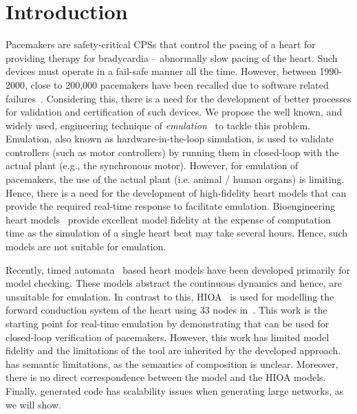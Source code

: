 \section{Introduction}

Pacemakers are safety-critical \acp{CPS} that control the pacing of a
heart for providing therapy for bradycardia -- abnormally slow pacing of
the heart. Such devices must operate in a fail-safe manner all the
time. However, between 1990-2000, close to 200,000 pacemakers have been
recalled due to software related
failures~\cite{alemzadeh13}. Considering this, there is a need for the
development of better processes for validation and certification of such
devices. We propose the well known, and widely used, engineering
technique of \emph{emulation}~\cite{patel2015survey} to tackle this
problem. Emulation, also known as hardware-in-the-loop simulation, is
used to validate controllers (such as motor controllers) by running them
in closed-loop with the actual plant (e.g., the synchronous motor).
However, for emulation of pacemakers, the use of the actual plant
(i.e. animal / human organs) is limiting. Hence, there is a need for the
development of high-fidelity heart models that can provide the required
real-time response to facilitate emulation. Bioengineering heart
models~\cite{Trayanova2014} provide excellent model fidelity at the
expense of computation time as the simulation of a single heart beat may
take several hours. Hence, such models are not suitable for emulation.

Recently, timed automata~\cite{zhihao12} based heart models have been
developed primarily for model checking. These models abstract the
continuous dynamics and hence, are unsuitable for emulation. In contrast
to this, \acf{HIOA}~\cite{alur2015book, raskin05} is used for modelling
the forward conduction system of the heart using 33 nodes
in~\cite{chen14}.
This work is the starting point for real-time
emulation by demonstrating that \simulink can be used for closed-loop
verification of pacemakers. However, this work has limited model
fidelity and the limitations of the tool \simulink are inherited by the
developed approach. \simulink has semantic limitations, as the semantics
of composition is unclear. Moreover, there is no
direct correspondence between the \simulink model and the \ac{HIOA}
models. Finally, \simulink generated code has scalability issues when 
generating large networks, as we will show.


